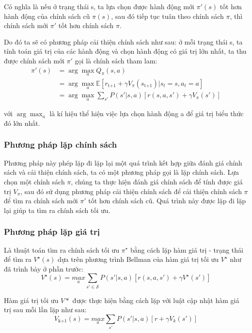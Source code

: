 \documentclass{uetgraduation}
\begin{document}
Có nghĩa là nếu ở trạng thái s, ta lựa chọn được hành động mới $\pi'(s)$ tốt hơn hành động của chính sách cũ $\pi(s)$, sau đó tiếp tục tuân theo chính sách $\pi$, thì chính sách mới
$\pi'$ tốt hơn chính sách $\pi$.

Do đó ta sẽ có phương pháp cải thiện chính sách như sau: ở mỗi trạng thái s, ta tính toán giá trị của các hành động và chọn hành động có giá trị lớn nhất, ta thu được chính sách mới
$\pi'$ gọi là chính sách tham lam:
\begin{equation}
    \begin{split}
        \pi' (s) &= \arg \max_{a} Q_\pi (s, a) \\
        &= \arg \max_{a} \mathbb{E} [r_\text{t+1} + \gamma V_\pi (s_\text{t+1}) | s_t = s, a_t = a] \\
        &= \arg \max_{a} \sum_{s'} P(s' | s, a) [r(s, a, s') + \gamma V_\pi(s')]
    \end{split}
\end{equation}

với $\arg \max_{a}$ là kí hiệu thể hiện việc lựa chọn hành động a để giá trị biểu thức đó lớn nhất.

\subsubsection{Phương pháp lặp chính sách}
Phương pháp này phép lặp đi lặp lại một quá trình kết hợp giữa đánh giá chính sách và cải thiện chính sách, ta có một phương pháp gọi là lặp chính sách. 
Lựa chọn một chính sách $\pi$, chúng ta thực hiện đánh giá chính sách để tính được giá trị $V_\pi$, sau đó sử dụng phương pháp cải thiện chính sách để cải thiện chính sách 
$\pi$ để tìm ra chính sách mới $\pi'$ tốt hơn chính sách cũ. Quá trình này được lặp đi lặp lại giúp ta tìm ra chính sách tối ưu.

\subsubsection{Phương pháp lặp giá trị}
Là thuật toán tìm ra chính sách tối ưu $\pi^\star$ bằng cách lặp hàm giá trị - trạng thái để tìm ra $V^\star (s)$ dựa trên phương trình Bellman của hàm giá trị tối ưu $V^\star$ như đã trình bày
ở phần trước:
\begin{equation}
    V^\star (s) = \underset{a}{max } \sum_{s' \in \mathcal{S}} P(s' | s, a) [r(s, a, s') + \gamma V^\star (s')]
\end{equation}

Hàm giá trị tối ưu $V*$ được thực hiện bằng cách lặp với luật cập nhật hàm giá trị sau mỗi lần lặp như sau:
\begin{equation}
    V_\text{k+1} (s) = \underset{a}{max } \sum_{s'} P(s' | s, a) [r + \gamma V_k (s')]
\end{equation}
\end{document}

